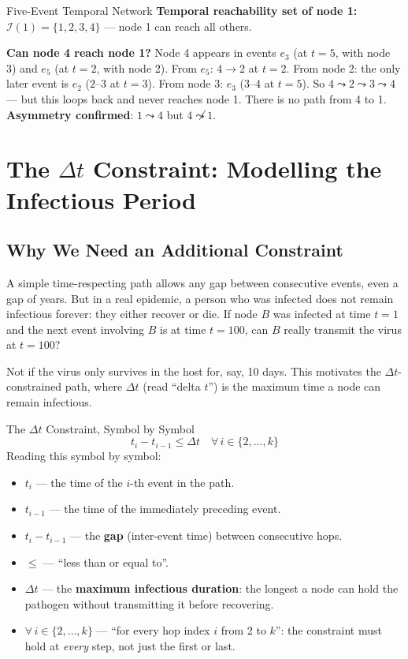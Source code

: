 \begin{examplebox}{Five-Event Temporal Network}
\medskip
\textbf{Temporal reachability set of node 1:} $\mathcal{I}(1) = \{1, 2, 3, 4\}$ --- node 1
can reach all others.

\textbf{Can node 4 reach node 1?} Node 4 appears in events $e_3$ (at $t=5$, with node 3) and
$e_5$ (at $t=2$, with node 2). From $e_5$: $4 \to 2$ at $t=2$. From node 2: the only later
event is $e_2$ ($2$--$3$ at $t=3$). From node 3: $e_3$ ($3$--$4$ at $t=5$). So $4 \leadsto 2
\leadsto 3 \leadsto 4$ --- but this loops back and never reaches node 1. There is no path from
4 to 1. \textbf{Asymmetry confirmed}: $1 \leadsto 4$ but $4 \not\leadsto 1$.
\end{examplebox}

\section{The $\Delta t$ Constraint: Modelling the Infectious Period}
\label{sec:delta_t_constraint}

\subsection{Why We Need an Additional Constraint}

A simple time-respecting path allows any gap between consecutive events, even a gap of years.
But in a real epidemic, a person who was infected does not remain infectious forever: they
either recover or die. If node $B$ was infected at time $t=1$ and the next event involving $B$
is at time $t=100$, can $B$ really transmit the virus at $t=100$?

Not if the virus only survives in the host for, say, 10 days. This motivates the
$\Delta t$-constrained path, where $\Delta t$ (read ``delta $t$'') is the maximum time a node
can remain infectious.

\begin{conceptbox}{The $\Delta t$ Constraint, Symbol by Symbol}
\[
  t_i - t_{i-1} \leq \Delta t \quad \forall\, i \in \{2, \ldots, k\}
\]
Reading this symbol by symbol:
\begin{itemize}[noitemsep]
  \item $t_i$ --- the time of the $i$-th event in the path.
  \item $t_{i-1}$ --- the time of the immediately preceding event.
  \item $t_i - t_{i-1}$ --- the \textbf{gap} (inter-event time) between consecutive hops.
  \item $\leq$ --- ``less than or equal to''.
  \item $\Delta t$ --- the \textbf{maximum infectious duration}: the longest a node can hold
        the pathogen without transmitting it before recovering.
  \item $\forall\, i \in \{2, \ldots, k\}$ --- ``for every hop index $i$ from 2 to $k$'': the
        constraint must hold at \textit{every} step, not just the first or last.
\end{itemize}
\end{conceptbox}

